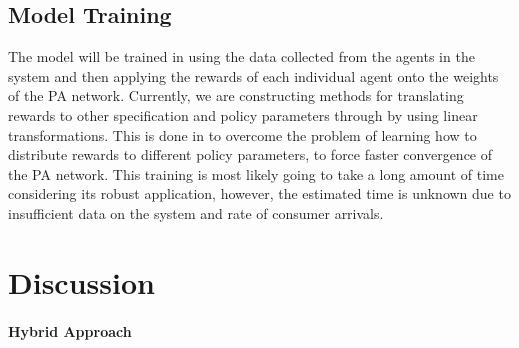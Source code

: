 \documentclass{article}
\theoremstyle{definition}
\theoremstyle{remark}
\begin{document}
		\subsection{Model Training}
		
		The model will be trained in using the data collected from the agents in the system and then applying the rewards of each individual agent onto the weights of the PA network. Currently, we are constructing methods for translating rewards to other specification and policy parameters through by using linear transformations. This is done in to overcome the problem of learning how to distribute rewards to different policy parameters, to force faster convergence of the PA network. This training is most likely going to take a long amount of time considering its robust application, however, the estimated time is unknown due to insufficient data on the system and rate of consumer arrivals. 
		
	\section{Discussion}
	
		\paragraph{Hybrid Approach}

	\newpage
\end{document}

